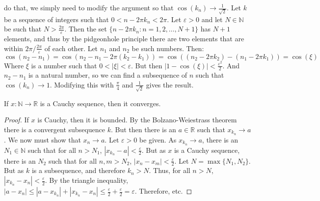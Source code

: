 \documentclass[crop=false,class=book,oneside]{standalone}
\begin{document}
\begin{example}
                do that, we simply need to modify the
                argument so that
                $\cos(k_{n})\rightarrow{\frac{1}{\sqrt{2}}}$.
                Let $k$ be a sequence of integers
                such that $0<n-2\pi{k_{n}}<2\pi$.
                Let $\varepsilon>0$ and let $N\in\mathbb{N}$
                be such that $N>\frac{2\pi}{\varepsilon}$.
                Then the set
                $\{n-2\pi{k_{n}}:n=1,2,\hdots,N+1\}$
                has $N+1$ elements, and thus by the
                pidgeonhole principle there are two
                elements that are within
                $2\pi/\frac{2\pi}{\varepsilon}$ of each other.
                Let $n_{1}$ and $n_{2}$ be such numbers.
                Then:
                \begin{equation*}
                    \cos(n_{2}-n_{1})
                    =\cos(n_{2}-n_{1}-2\pi(k_{2}-k_{1}))
                    =\cos((n_{2}-2\pi{k}_{2})
                           -(n_{1}-2\pi{k_{1}}))
                    =\cos(\xi)
                \end{equation*}
                Where $\xi$ is a number such that
                $0<|\xi|<\varepsilon$. But then
                $|1-\cos(\xi)|<\frac{\varepsilon^{2}}{2}$.
                And $n_{2}-n_{1}$ is a natural number,
                so we can find a subsequence of $n$ such
                that $\cos(k_{n})\rightarrow{1}$. Modifying
                this with $\frac{\pi}{4}$
                and $\frac{1}{\sqrt{2}}$ gives the result.
            \end{example}
            \begin{theorem}
                If $x:\mathbb{N}\rightarrow\mathbb{R}$ is
                a Cauchy sequence, then it converges.
            \end{theorem}
            \begin{proof}
                If $x$ is Cauchy, then it is bounded.
                By the Bolzano-Weiestrass theorem there
                is a convergent subsequence $k$. But then there
                is an $a\in\mathbb{R}$ such that
                $x_{k_{n}}\rightarrow{a}$. We now must show that
                $x_{n}\rightarrow{a}$. Let $\varepsilon>0$
                be given. As $x_{k_{n}}\rightarrow{a}$,
                there is an $N_{1}\in\mathbb{N}$ such
                that for all $n>N_{1}$,
                $|x_{k_{n}}-a|<\frac{\varepsilon}{2}$.
                But as $x$ is a Cauchy sequence, there
                is an $N_{2}$ such that for all $n,m>N_{2}$, 
                $|x_{n}-x_{m}|<\frac{\varepsilon}{2}$. Let
                $N=\max\{N_{1},N_{2}\}$. 
                But as $k$ is a subsequence, and therefore
                $k_{n}>N$. Thus, for all $n>N$,
                $|x_{k_{n}}-x_{n}|<\frac{\varepsilon}{2}$.
                By the triangle inequality,
                    $|a-x_{n}|\leq
                     |a-x_{k_{n}}|+|x_{k_{n}}-x_{n}|\leq
                     \frac{\varepsilon}{2}+
                     \frac{\varepsilon}{2}%
                     =\varepsilon$.
               Therefore, etc.
            \end{proof}
\end{document}
